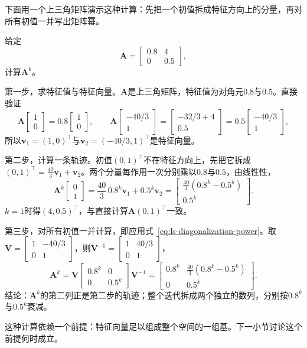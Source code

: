 下面用一个上三角矩阵演示这种计算：先把一个初值拆成特征方向上的分量，再对所有初值一并写出矩阵幂。
\begin{example}[用特征向量计算矩阵幂]
\label{ex:ls-triangular-power}
给定
\[
 \bm A=\begin{bmatrix}0.8&4\\0&0.5\end{bmatrix},
\]
计算$\bm A^k$。

第一步，求特征值与特征向量。$\bm A$是上三角矩阵，特征值为对角元$0.8$与$0.5$。直接验证
\[
 \bm A\begin{bmatrix}1\\0\end{bmatrix}=0.8\begin{bmatrix}1\\0\end{bmatrix},\qquad
 \bm A\begin{bmatrix}-40/3\\1\end{bmatrix}
 =\begin{bmatrix}-32/3+4\\0.5\end{bmatrix}
 =0.5\begin{bmatrix}-40/3\\1\end{bmatrix},
\]
所以$\bm v_1=(1,0)^{\top}$与$\bm v_2=(-40/3,1)^{\top}$是特征向量。

第二步，计算一条轨迹。初值$(0,1)^{\top}$不在特征方向上，先把它拆成$(0,1)^{\top}=\tfrac{40}{3}\bm v_1+\bm v_2$。两个分量每作用一次分别乘以$0.8$与$0.5$，由线性性，
\[
 \bm A^k\begin{bmatrix}0\\1\end{bmatrix}
 =\frac{40}{3}\,0.8^k\bm v_1+0.5^k\bm v_2
 =\begin{bmatrix}\tfrac{40}{3}(0.8^k-0.5^k)\\0.5^k\end{bmatrix}.
\]
$k=1$时得$(4,0.5)^{\top}$，与直接计算$\bm A(0,1)^{\top}$一致。

第三步，对所有初值一并计算，即应用式~\eqref{eq:ls-diagonalization-power}。取$\bm V=\left[\begin{smallmatrix}1&-40/3\\0&1\end{smallmatrix}\right]$，则$\bm V^{-1}=\left[\begin{smallmatrix}1&40/3\\0&1\end{smallmatrix}\right]$，
\[
 \bm A^k=\bm V\begin{bmatrix}0.8^k&0\\0&0.5^k\end{bmatrix}\bm V^{-1}
 =\begin{bmatrix}0.8^k&\tfrac{40}{3}(0.8^k-0.5^k)\\0&0.5^k\end{bmatrix}.
\]
结论：$\bm A^k$的第二列正是第二步的轨迹；整个迭代拆成两个独立的数列，分别按$0.8^k$与$0.5^k$衰减。
\end{example}
这种计算依赖一个前提：特征向量足以组成整个空间的一组基。下一小节讨论这个前提何时成立。

